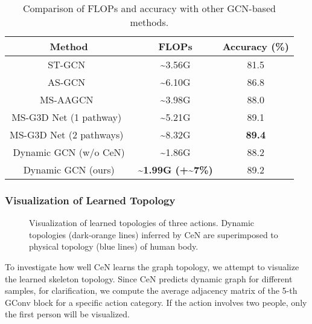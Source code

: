 \documentclass[sigconf]{acmart}
\begin{document}
\begin{table}[tbp]
  \centering
  \caption{Comparison of FLOPs and accuracy with other GCN-based methods.}
  \label{flops}
    \begin{tabular}{c|c|c}
    \toprule
      Method & FLOPs & \multicolumn{1}{c}{Accuracy (\%) }  \\
    \midrule
    ST-GCN~\cite{yanspatial} & \textasciitilde3.56G & 81.5   \\
    AS-GCN~\cite{li2019actional} & \textasciitilde6.10G  & 86.8   \\
    MS-AAGCN~\cite{shi2019} & \textasciitilde3.98G & 88.0     \\
    MS-G3D Net (1 pathway)~\cite{liu2020} & \textasciitilde5.21G & 89.1   \\
    MS-G3D Net (2 pathways)~\cite{liu2020} & \textasciitilde8.32G & \textbf{89.4}   \\
    \midrule
    Dynamic GCN (w/o CeN) & \textasciitilde1.86G & 88.2   \\
    Dynamic GCN (ours) & \textbf{\textasciitilde1.99G (+\textasciitilde7\%)} & 89.2    \\
    \bottomrule
    \end{tabular}\end{table}


\subsubsection{Visualization of Learned Topology}
\begin{figure}[t]
\centering
{}\centering
\caption{Visualization of learned topologies of three actions. Dynamic topologies (dark-orange lines) inferred by CeN are superimposed to physical topology (blue lines) of human body.}
\label{fig6}
\end{figure}

To investigate how well CeN learns the graph topology, we attempt to visualize the learned skeleton topology. Since CeN predicts dynamic graph for different samples, for clarification, we compute the average adjacency matrix of the 5-th GConv block for a specific action category. If the action involves two people, only the first person will be visualized.
\end{document}
